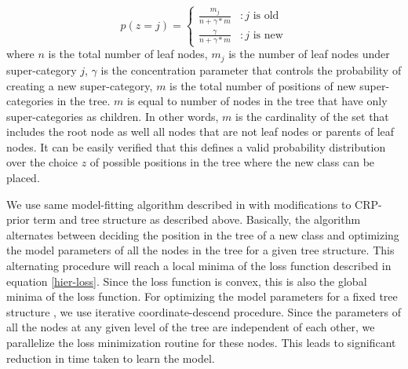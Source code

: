 \documentclass[10pt,twocolumn,letterpaper]{article}
\begin{document}
\begin{displaymath}
  p(z=j) = \left \{
  \begin{array}{lr}
    \frac{m_{j}}{n+\gamma*m} & : \text{$j$ is old} \\
    \frac{\gamma}{n+\gamma*m} & : \text{$j$ is new}
  \end{array}
  \right.
\end{displaymath}  
where $n$ is the total number of leaf nodes, $m_{j}$ is the number of leaf
nodes under super-category $j$, $\gamma$ is the concentration parameter that
controls the probability of creating a new super-category, $m$ is the total
number of positions of new super-categories in the tree. $m$ is equal to number
of nodes in the tree that have only super-categories as children. In other
words, $m$ is the cardinality of the set that includes the root node as well
all nodes that are not leaf nodes or parents of leaf nodes. It can be easily
verified that this defines a valid probability distribution over the choice $z$
of possible positions in the tree where the new class can be placed.

We use same model-fitting algorithm described in \cite{ruslan} with
modifications to CRP-prior term and tree structure as described above.
Basically, the algorithm alternates between deciding the position in the tree
of a new class and optimizing the model parameters of all the nodes in the tree
for a given tree structure.  This alternating procedure will reach a local
minima of the loss function described in equation \ref{hier-loss}. Since the
loss function is convex, this is also the global minima of the loss function.
For optimizing the model parameters for a fixed tree structure , we use
iterative coordinate-descend procedure.  Since the parameters of all the nodes
at any given level of the tree are independent of each other, we parallelize
the loss minimization routine for these nodes. This leads to significant
reduction in time taken to learn the model.
\end{document}
